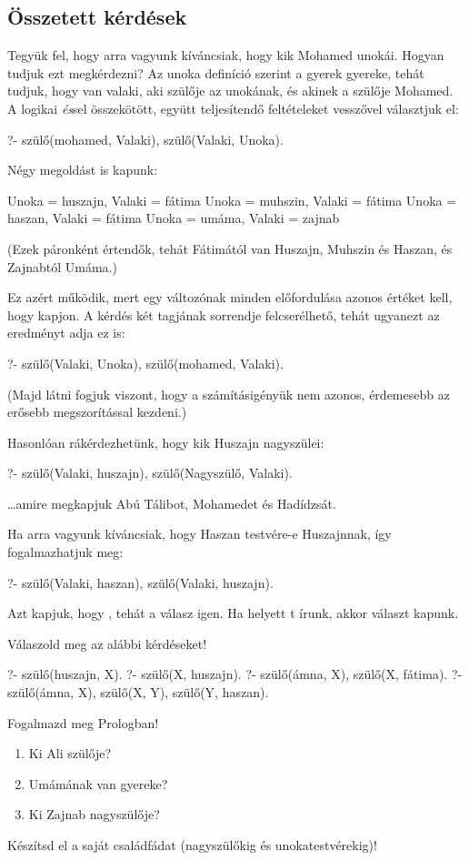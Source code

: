 \subsection*{Összetett kérdések}

Tegyük fel, hogy arra vagyunk kíváncsiak, hogy kik
Mohamed unokái. Hogyan tudjuk ezt megkérdezni? Az
unoka definíció szerint a gyerek gyereke, tehát
tudjuk, hogy van valaki, aki szülője az unokának, és
akinek a szülője Mohamed. A logikai \emph{és}\/sel
összekötött, együtt teljesítendő feltételeket
vesszővel választjuk el:
\begin{query}
?- szülő(mohamed, Valaki), szülő(Valaki, Unoka).
\end{query}
Négy megoldást is kapunk:
\begin{query}
Unoka = huszajn,
Valaki = fátima
Unoka = muhszin,
Valaki = fátima
Unoka = haszan,
Valaki = fátima
Unoka = umáma,
Valaki = zajnab
\end{query}
(Ezek páronként értendők, tehát Fátimától van
Huszajn, Muhszin és Haszan, és Zajnabtól Umáma.)

Ez azért működik, mert egy változónak minden
előfordulása azonos értéket kell, hogy kapjon.
A kérdés két tagjának sorrendje felcserélhető, tehát
ugyanezt az eredményt adja ez is:
\begin{query}
?- szülő(Valaki, Unoka), szülő(mohamed, Valaki).
\end{query}
(Majd látni fogjuk viszont, hogy a számításigényük
nem azonos, érdemesebb az erősebb megszorítással
kezdeni.)

Hasonlóan rákérdezhetünk, hogy kik Huszajn
nagyszülei:
\begin{query}
?- szülő(Valaki, huszajn), szülő(Nagyszülő, Valaki).
\end{query}
\dots amire megkapjuk Abú Tálibot, Mohamedet és
Hadídzsát.

Ha arra vagyunk kíváncsiak, hogy Haszan testvére-e
Huszajnnak, így fogalmazhatjuk meg:
\begin{query}
?- szülő(Valaki, haszan), szülő(Valaki, huszajn).
\end{query}
Azt kapjuk, hogy , tehát a válasz
igen. Ha  helyett t írunk,
akkor  választ kapunk.

\begin{problem}
Válaszold meg az alábbi kérdéseket!
\begin{query}
?- szülő(huszajn, X).
?- szülő(X, huszajn).
?- szülő(ámna, X), szülő(X, fátima).
?- szülő(ámna, X), szülő(X, Y), szülő(Y, haszan).
\end{query}
\end{problem}
\begin{problem}
Fogalmazd meg Prologban!
\begin{enumerate}
\item Ki Ali szülője?
\item Umámának van gyereke?
\item Ki Zajnab nagyszülője?
\end{enumerate}
\end{problem}
\begin{problem}
Készítsd el a saját családfádat (nagyszülőkig
és unokatestvérekig)!
\end{problem}


